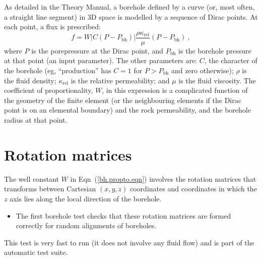\documentclass[]{scrreprt}
\begin{document}
As detailed in the Theory Manual, a borehole defined by a curve (or,
most often, a straight line segment) in 3D space is modelled by a
sequence of Dirac points.  At each point, a flux is prescribed:
\begin{equation}
f = W|C(P-P_{\mathrm{bh}})| \frac{\rho \kappa_{\mathrm{rel}}}{\mu} (P - P_{\mathrm{bh}}) \ ,
\label{bh.propto.eqn}
\end{equation}
where $P$ is the porepressure at the Dirac point, and
$P_{\mathrm{bh}}$ is the borehole pressure at that point (an input
parameter).  The other parameters are: $C$, the character of the
borehole (eg, ``production'' has $C=1$ for $P>P_{\mathrm{bh}}$ and zero
otherwise); $\rho$ is the fluid density; $\kappa_{\mathrm{rel}}$ is
the relative permeability; and $\mu$ is the fluid viscosity.   The
coefficient of proportionality, $W$, in this expression is a
complicated function of the geometry of the finite element (or the
neighbouring elements if the Dirac point is on an elemental boundary)
and the rock permeability, and the borehole radius at that point.

\section{Rotation matrices}
The well constant $W$ in Eqn~(\ref{bh.propto.eqn})
involves the rotation matrices that transforms between Cartesian
$(x,y,z)$ coordinates and coordinates in which the $z$ axis lies along
the local direction of the borehole.
\begin{itemize}
\item The first borehole test checks that these rotation matrices are
  formed correctly for random alignments of boreholes.
\end{itemize}
This test is very fast to run (it does not involve any fluid flow) and
is part of the automatic test suite.
\end{document}
